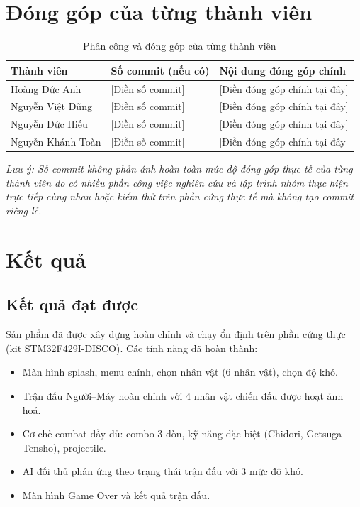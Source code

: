 \documentclass[a4paper,12pt]{report}
\begin{document}
\section{Đóng góp của từng thành viên}

\begin{table}[H]
\centering
\caption{Phân công và đóng góp của từng thành viên}
\begin{tabular}{p{3.5cm} p{3.5cm} p{7cm}}
\toprule
\textbf{Thành viên} & \textbf{Số commit (nếu có)} & \textbf{Nội dung đóng góp chính} \\
\midrule
Hoàng Đức Anh & [Điền số commit] & [Điền đóng góp chính tại đây] \\[4pt]
Nguyễn Việt Dũng & [Điền số commit] & [Điền đóng góp chính tại đây] \\[4pt]
Nguyễn Đức Hiếu & [Điền số commit] & [Điền đóng góp chính tại đây] \\[4pt]
Nguyễn Khánh Toàn & [Điền số commit] & [Điền đóng góp chính tại đây] \\
\bottomrule
\end{tabular}
\end{table}

\noindent\textit{Lưu ý: Số commit không phản ánh hoàn toàn mức độ đóng góp thực tế của từng thành viên do có nhiều phần công việc nghiên cứu và lập trình nhóm thực hiện trực tiếp cùng nhau hoặc kiểm thử trên phần cứng thực tế mà không tạo commit riêng lẻ.}

\section{Kết quả}

\subsection{Kết quả đạt được}

Sản phẩm đã được xây dựng hoàn chỉnh và chạy ổn định trên phần cứng thực (kit STM32F429I-DISCO). Các tính năng đã hoàn thành:

\begin{itemize}
    \item Màn hình splash, menu chính, chọn nhân vật (6 nhân vật), chọn độ khó.
    \item Trận đấu Người--Máy hoàn chỉnh với 4 nhân vật chiến đấu được hoạt ảnh hoá.
    \item Cơ chế combat đầy đủ: combo 3 đòn, kỹ năng đặc biệt (Chidori, Getsuga Tensho), projectile.
    \item AI đối thủ phản ứng theo trạng thái trận đấu với 3 mức độ khó.
    \item Màn hình Game Over và kết quả trận đấu.
\end{itemize}
\end{document}
